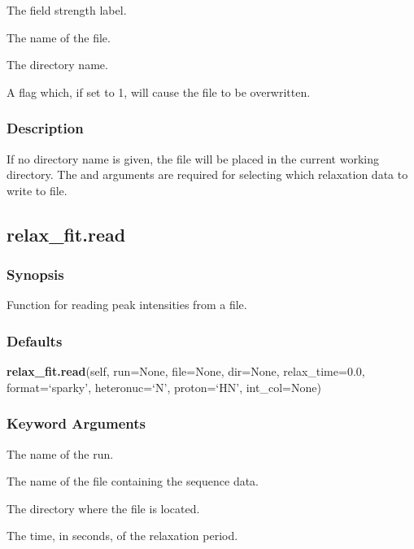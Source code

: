  The field strength label. 

  The name of the file. 

  The directory name. 

  A flag which, if set to 1, will cause the file to be overwritten. 




\subsubsection{Description}

If no directory name is given, the file will be placed in the current working directory. The  and  arguments are required for selecting which relaxation data to write to file.




\newpage

\subsection{relax\_fit.read}


\subsubsection{Synopsis}

Function for reading peak intensities from a file.



\subsubsection{Defaults}

\textsf{\textbf{relax\_fit.read}(self, run=None, file=None, dir=None, relax\_time=0.0, format=`sparky', heteronuc=`N', proton=`HN', int\_col=None)}


\subsubsection{Keyword Arguments}

  The name of the run. 

  The name of the file containing the sequence data. 

  The directory where the file is located. 

  The time, in seconds, of the relaxation period. 

